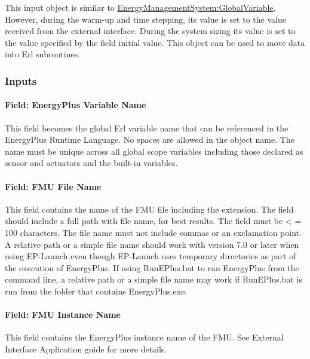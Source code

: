 This input object is similar to \hyperref[energymanagementsystemglobalvariable]{EnergyManagementSystem:GlobalVariable}. However, during the warm-up and time stepping, its value is set to the value received from the external interface. During the system sizing its value is set to the value specified by the field initial value. This object can be used to move data into Erl subroutines.

\subsubsection{Inputs}\label{inputs-8-007}

\paragraph{Field: EnergyPlus Variable Name}\label{field-energyplus-variable-name-3}

This field becomes the global Erl variable name that can be referenced in the EnergyPlus Runtime Language. No spaces are allowed in the object name. The name must be unique across all global scope variables including those declared as sensor and actuators and the built-in variables.

\paragraph{Field: FMU File Name}\label{field-fmu-file-name-4}

This field contains the name of the FMU file including the extension. The field should include a full path with file name, for best results. The field must be \textless{} = 100 characters. The file name must not include commas or an exclamation point. A relative path or a simple file name should work with version 7.0 or later when using EP-Launch even though EP-Launch uses temporary directories as part of the execution of EnergyPlus. If using RunEPlus.bat to run EnergyPlus from the command line, a relative path or a simple file name may work if RunEPlus.bat is run from the folder that contains EnergyPlus.exe.

\paragraph{Field: FMU Instance Name}\label{field-fmu-instance-name-3}

This field contains the EnergyPlus instance name of the FMU. See External Interface Application guide for more details.

